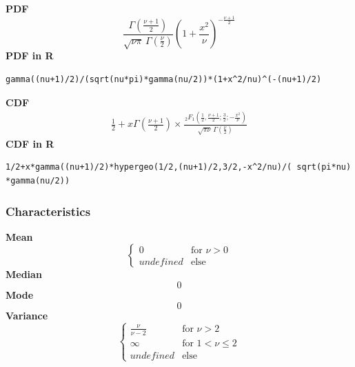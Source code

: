 \smallskip \noindent \hspace{.2cm} \textbf{PDF} 
\begin{equation*}\frac{\Gamma \left(\frac{\nu+1}{2} \right)} {\sqrt{\nu\pi}\,\Gamma \left(\frac{\nu}{2} \right)} \left(1+\frac{x^2}{\nu} \right)^{-\frac{\nu+1}{2}}\end{equation*}
\smallskip \noindent \hspace{.2cm} \textbf{PDF in R}  
\begin{verbatim}gamma((nu+1)/2)/(sqrt(nu*pi)*gamma(nu/2))*(1+x^2/nu)^(-(nu+1)/2)\end{verbatim}
\smallskip \noindent \hspace{.2cm} \textbf{CDF} 
\begin{equation*}\begin{matrix}
     \frac{1}{2} + x \Gamma \left( \frac{\nu+1}{2} \right)  \times
     \frac{\,_2F_1 \left ( \frac{1}{2},\frac{\nu+1}{2};\frac{3}{2};
           -\frac{x^2}{\nu} \right)}
     {\sqrt{\pi\nu}\,\Gamma \left(\frac{\nu}{2}\right)}
     \end{matrix}\end{equation*}
\smallskip \noindent \hspace{.2cm} \textbf{CDF in R} 
\begin{verbatim}1/2+x*gamma((nu+1)/2)*hypergeo(1/2,(nu+1)/2,3/2,-x^2/nu)/( sqrt(pi*nu) *gamma(nu/2))\end{verbatim}
\smallskip
\subsubsection*{Characteristics}
\smallskip \noindent \hspace{.2cm} \textbf{Mean} 
\begin{equation*}\begin{cases}
0 & \text{for }\nu > 0 \\ undefined & \text{else} 
\end{cases}\end{equation*}
\smallskip \noindent \hspace{.2cm} \textbf{Median} 
\begin{equation*}0\end{equation*}
\smallskip \noindent \hspace{.2cm} \textbf{Mode} 
\begin{equation*}0\end{equation*}
\smallskip \noindent \hspace{.2cm} \textbf{Variance} 
\begin{equation*}\begin{cases}
\frac{\nu}{\nu - 2} & \text{for }\nu > 2 \\
\infty & \text{for } 1< \nu \leq 2 \\
undefined & \text{else} 
\end{cases}\end{equation*}
\smallskip
